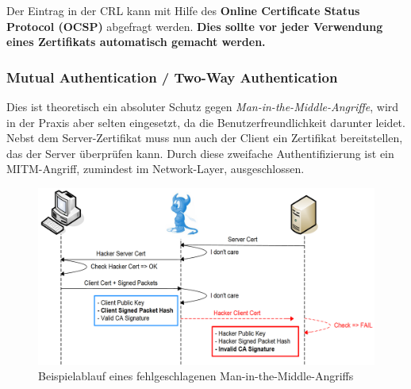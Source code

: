 Der Eintrag in der CRL kann mit Hilfe des \textbf{Online Certificate Status Protocol (OCSP)} abgefragt werden. \textbf{Dies sollte vor jeder Verwendung eines Zertifikats automatisch gemacht werden.}

\subsubsection{Mutual Authentication / Two-Way Authentication}
Dies ist theoretisch ein absoluter Schutz gegen \textit{Man-in-the-Middle-Angriffe}, wird in der Praxis aber selten eingesetzt, da die Benutzerfreundlichkeit darunter leidet.
Nebst dem Server-Zertifikat muss nun auch der Client ein Zertifikat bereitstellen, das der Server überprüfen kann. Durch diese zweifache Authentifizierung ist ein MITM-Angriff, zumindest im Network-Layer, ausgeschlossen.

\begin{figure}[H]
	\centering
	\includegraphics[width=\textwidth]{./img/mutual-authentication}
	\caption{Beispielablauf eines fehlgeschlagenen Man-in-the-Middle-Angriffs}
\end{figure}